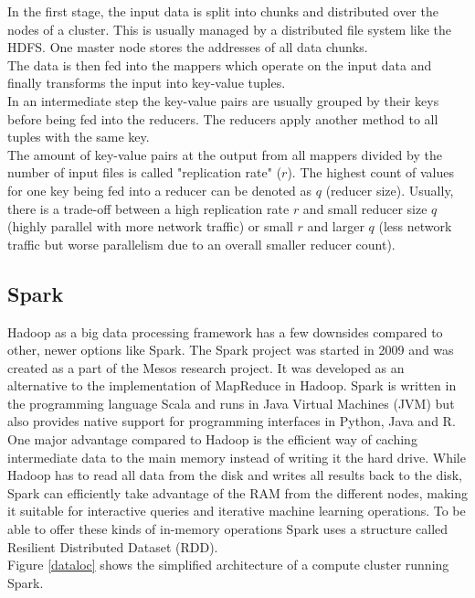 \noindent In the first stage, the input data is split into chunks and distributed over the nodes of a cluster. This is usually managed by a distributed file system like the HDFS. One master node stores the addresses of all data chunks.\\
The data is then fed into the mappers which operate on the input data and finally transforms the input into key-value tuples.\\
In an intermediate step the key-value pairs are usually grouped by their keys before being fed into the reducers. The reducers apply another method to all tuples with the same key.\\
The amount of key-value pairs at the output from all mappers divided by the number of input files is called "replication rate" ($r$). The highest count of values for one key being fed into a reducer can be denoted as $q$ (reducer size). Usually, there is a trade-off between a high replication rate $r$ and small reducer size $q$ (highly parallel with more network traffic) or small $r$ and larger $q$ (less network traffic but worse parallelism due to an overall smaller reducer count).

\subsection{Spark}\label{sparksec}

Hadoop as a big data processing framework has a few downsides compared to other, newer options like Spark. The Spark project was started in 2009 and was created as a part of the Mesos research project. It was developed as an alternative to the implementation of MapReduce in Hadoop. Spark is written in the programming language Scala and runs in Java Virtual Machines (JVM) but also provides native support for programming interfaces in Python, Java and R. One major advantage compared to Hadoop is the efficient way of caching intermediate data to the main memory instead of writing it the hard drive. While Hadoop has to read all data from the disk and writes all results back to the disk, Spark can efficiently take advantage of the RAM from the different nodes, making it suitable for interactive queries and iterative machine learning operations. To be able to offer these kinds of in-memory operations Spark uses a structure called Resilient Distributed Dataset (RDD). \cite[p. 13]{sparkbook1}\\ 
Figure \ref{dataloc} shows the simplified architecture of a compute cluster running Spark. 

